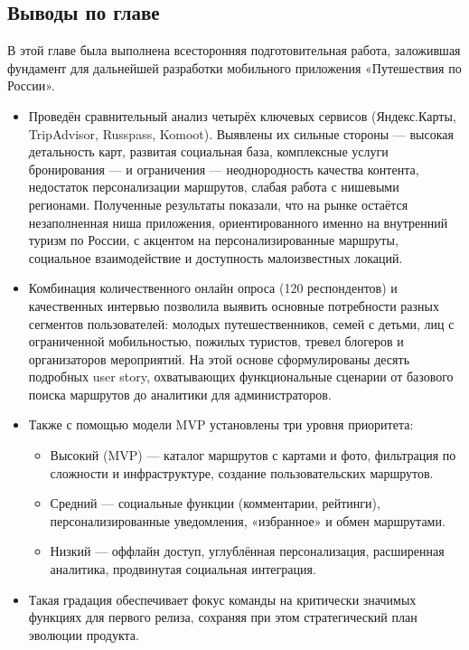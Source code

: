 \subsection*{Выводы по главе}
В этой главе была выполнена всесторонняя подготовительная работа, заложившая фундамент для дальнейшей разработки мобильного приложения «Путешествия по России».
\begin{itemize}
    \item Проведён сравнительный анализ четырёх ключевых сервисов (Яндекс.Карты, TripAdvisor, Russpass, Komoot). Выявлены их сильные стороны — высокая детальность карт, развитая социальная база, комплексные услуги бронирования — и ограничения — неоднородность качества контента, недостаток персонализации маршрутов, слабая работа с нишевыми регионами. Полученные результаты показали, что на рынке остаётся незаполненная ниша приложения, ориентированного именно на внутренний туризм по России, с акцентом на персонализированные маршруты, социальное взаимодействие и доступность малоизвестных локаций.
    \item Комбинация количественного онлайн опроса (120 респондентов) и качественных интервью позволила выявить основные потребности разных сегментов пользователей: молодых путешественников, семей с детьми, лиц с ограниченной мобильностью, пожилых туристов, тревел блогеров и организаторов мероприятий. На этой основе сформулированы десять подробных user story, охватывающих функциональные сценарии от базового поиска маршрутов до аналитики для администраторов.
    \item Также с помощью модели MVP установлены три уровня приоритета:
    \begin{itemize}
        \item Высокий (MVP) — каталог маршрутов с картами и фото, фильтрация по сложности и инфраструктуре, создание пользовательских маршрутов.
        \item Средний — социальные функции (комментарии, рейтинги), персонализированные уведомления, «избранное» и обмен маршрутами.
        \item Низкий — оффлайн доступ, углублённая персонализация, расширенная аналитика, продвинутая социальная интеграция.
    \end{itemize}
    \item Такая градация обеспечивает фокус команды на критически значимых функциях для первого релиза, сохраняя при этом стратегический план эволюции продукта.
\end{itemize}

